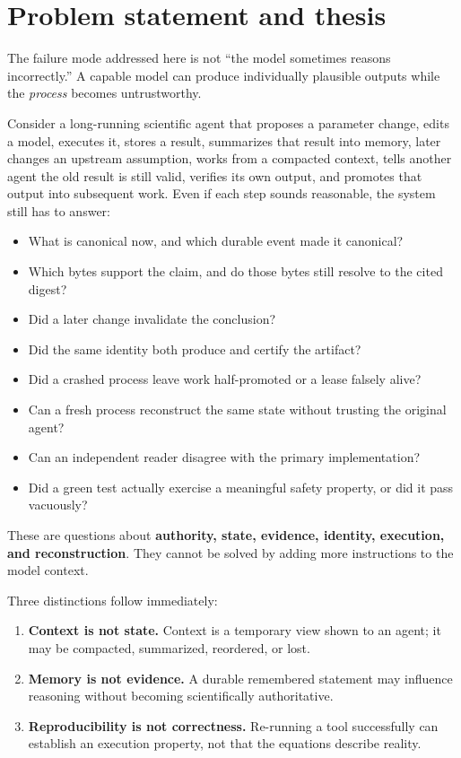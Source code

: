 \section{Problem statement and thesis}

The failure mode addressed here is not ``the model sometimes reasons incorrectly.'' A capable model can produce individually plausible outputs while the \emph{process} becomes untrustworthy.

Consider a long-running scientific agent that proposes a parameter change, edits a model, executes it, stores a result, summarizes that result into memory, later changes an upstream assumption, works from a compacted context, tells another agent the old result is still valid, verifies its own output, and promotes that output into subsequent work. Even if each step sounds reasonable, the system still has to answer:

\begin{itemize}
  \item What is canonical now, and which durable event made it canonical?
  \item Which bytes support the claim, and do those bytes still resolve to the cited digest?
  \item Did a later change invalidate the conclusion?
  \item Did the same identity both produce and certify the artifact?
  \item Did a crashed process leave work half-promoted or a lease falsely alive?
  \item Can a fresh process reconstruct the same state without trusting the original agent?
  \item Can an independent reader disagree with the primary implementation?
  \item Did a green test actually exercise a meaningful safety property, or did it pass vacuously?
\end{itemize}

These are questions about \textbf{authority, state, evidence, identity, execution, and reconstruction}. They cannot be solved by adding more instructions to the model context.


Three distinctions follow immediately:

\begin{enumerate}
  \item \textbf{Context is not state.} Context is a temporary view shown to an agent; it may be compacted, summarized, reordered, or lost.
  \item \textbf{Memory is not evidence.} A durable remembered statement may influence reasoning without becoming scientifically authoritative.
  \item \textbf{Reproducibility is not correctness.} Re-running a tool successfully can establish an execution property, not that the equations describe reality.
\end{enumerate}

